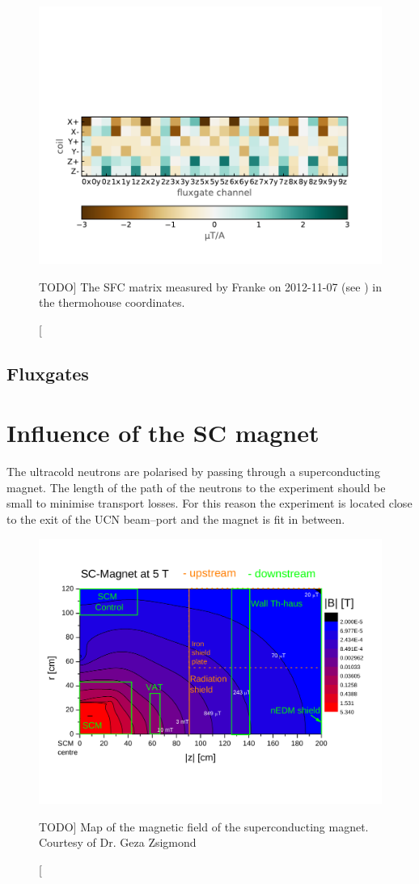 \begin{figure}
  \myfloatalign
  \includegraphics[width=.8\linewidth]{gfx/nEDM_SFC/nEDM_SFC_matrix}
  \caption
  [TODO]
  {The SFC matrix measured by Franke on 2012-11-07 (see \cite{Franke2013}) in the thermohouse coordinates.}
  \label{fig:nEDM_SFC_matrix}
\end{figure}

\subsection{Fluxgates}


\section{Influence of the SC magnet}
The ultracold neutrons are polarised by passing through a superconducting magnet. The length of the path of the neutrons to the experiment should be small to minimise transport losses. For this reason the experiment is located close to the exit of the UCN beam--port and the magnet is fit in between.

\begin{figure}
  \myfloatalign
  \includegraphics[width=.7\linewidth]{gfx/nEDM_SFC/SCM_magn_map.pdf}
  \caption
  [TODO]
  {Map of the magnetic field of the superconducting magnet. Courtesy of Dr. Geza Zsigmond}
  \label{fig:nEDM_SFC_SC_magnet_map}
\end{figure}

